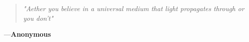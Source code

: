 \thispagestyle{empty}
\vspace*{0.4\textwidth}
\begin{quote} 
\textit{\large "Aether you believe in a universal medium that light propagates through or you don't"}
\end{quote}
{\hspace*{\fill} —\textbf{Anonymous}}
\newpage